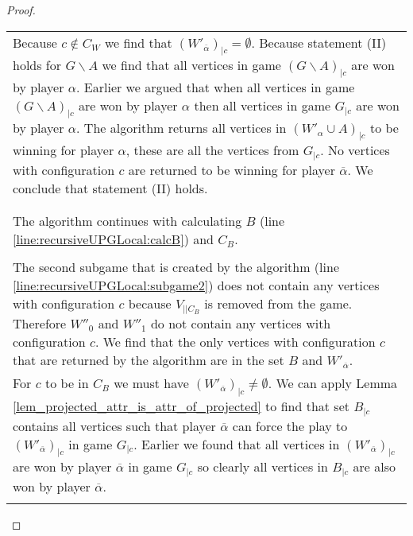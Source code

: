 \begin{theorem}
\begin{proof}
\begin{longtable}{|p{14.2cm}}
			\begin{tabular}{|p{14cm}}
				Assume $(W'_{\overline{\alpha}})_{|\backslash C_W} = \emptyset$ (line \ref{line:recursiveUPGLocal:wopponentwithoutCWisempty})\\
				\hline
				Because $c \notin C_W$ we find that $(W'_{\overline{\alpha}})_{|c} = \emptyset$. Because statement (II) holds for $G\backslash A$ we find that all vertices in game $(G \backslash A)_{|c}$ are won by player $\alpha$. Earlier we argued that when all vertices in game $(G\backslash A)_{|c}$ are won by player $\alpha$ then all vertices in game $G_{|c}$ are won by player $\alpha$. The algorithm returns all vertices in $(W'_\alpha \cup A)_{|c}$ to be winning for player $\alpha$, these are all the vertices from $G_{|c}$. No vertices with configuration $c$ are returned to be winning for player $\overline{\alpha}$. We conclude that statement (II) holds.
			\end{tabular}\\\\
			\begin{tabular}{|p{14cm}}
				Assume $(W'_{\overline{\alpha}})_{|\backslash C_W} \neq \emptyset$ (line \ref{line:recursiveUPGLocal:wopponentwithoutCWisempty})\\
				\hline
				The algorithm continues with calculating $B$ (line \ref{line:recursiveUPGLocal:calcB}) and $C_B$.\\
				\begin{tabular}{|p{13.8cm}}
					Assume $c \in C_B$\\
					\hline
					The second subgame that is created by the algorithm (line \ref{line:recursiveUPGLocal:subgame2}) does not contain any vertices with configuration $c$ because $V_{||C_B}$ is removed from the game. Therefore $W''_0$ and $W''_1$ do not contain any vertices with configuration $c$. We find that the only vertices with configuration $c$ that are returned by the algorithm are in the set $B$ and $W'_{\overline{\alpha}}$.\\
					For $c$ to be in $C_B$ we must have $(W'_{\overline{\alpha}})_{|c} \neq \emptyset$. We can apply Lemma \ref{lem_projected_attr_is_attr_of_projected} to find that set $B_{|c}$ contains all vertices such that player $\overline{\alpha}$ can force the play to $(W'_{\overline{\alpha}})_{|c}$ in game $G_{|c}$. Earlier we found that all vertices in $(W'_{\overline{\alpha}})_{|c}$ are won by player $\overline{\alpha}$ in game $G_{|c}$ so clearly all vertices in $B_{|c}$ are also won by player $\overline{\alpha}$.\\

\end{tabular}
\end{tabular}
\end{longtable}
\end{proof}
\end{theorem}
